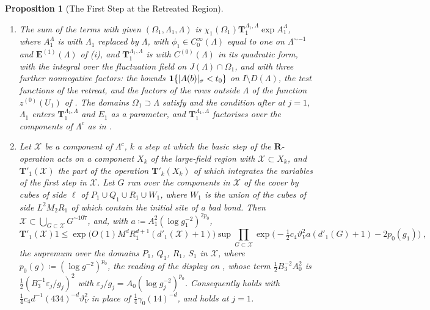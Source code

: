 \documentclass[11pt]{preprint}
\newcommand{\id}{\mathbf 1}
\DeclarePairedDelimiter{\abs}{\lvert}{\rvert}
\numberwithin{equation}{section}
\newtheorem{proposition}{Proposition}
\theoremstyle{definition}
\theoremstyle{remark}
\theoremstyle{plain}
\begin{document}
\begin{proposition}[The First Step at the Retreated Region]
\begin{enumerate}[label=(\roman*)]
\item The sum of the terms with given $(\Omega_1, \Lambda_1, \Lambda)$ is $\chi_1(\Omega_1)\mathbf T_1^{\Lambda_1, \Lambda}\exp A_1^\Lambda$, where $A^\Lambda_1$ is \cite[(1.30), p.~254]{BalabanCRE} with $\Lambda_1$ replaced by $\Lambda$, with $\phi_1 \in C_0^\infty(\Lambda)$ equal to one on $\Lambda^{\sim-1}$ and $\mathbf E^{(1)}(\Lambda)$ of (i), and $\mathbf T_1^{\Lambda_1, \Lambda}$ is \cite[(1.29), p.~254]{BalabanCRE} with $C^{(0)}(\Lambda)$ in its quadratic form, with the integral over the fluctuation field on $J(\Lambda) \cap \Omega_1$, and with three further nonnegative factors: the bounds $\id\{\abs{A(b)}_\sigma < t_0\}$ on $I \setminus D(\Lambda)$, the test functions of the retreat, and the factors of the rows outside $\Lambda$ of the function $z^{(0)}(U_1)$ of \cite[(3.5)]{WilsonFirstStep}. The domains $\Omega_1 \supset \Lambda$ satisfy \cite[(2.1), p.~254]{BalabanCRE} and the condition after \cite[(2.3), p.~255]{BalabanCRE} at $j = 1$, $\Lambda_1$ enters $\mathbf T^{\Lambda_1, \Lambda}_1$ and $E_1$ as a parameter, and $\mathbf T^{\Lambda_1, \Lambda}_1$ factorises over the components of $\Lambda^c$ as in \cite[(2.19), (2.21), p.~258]{BalabanCRE}.
\item Let $\mathcal X$ be a component of $\Lambda^c$, $k$ a step at which the basic step of the $\mathbf R$-operation acts on a component $X_k$ of the large-field region with $\mathcal X \subset X_k$, and $\mathbf T'_1(\mathcal X)$ the part of the operation $\mathbf T'_k(X_k)$ of \cite[(1.71), p.~379]{BalabanLFR2} which integrates the variables of the first step in $\mathcal X$. Let $G$ run over the components in $\mathcal X$ of the cover by cubes of side $\ell$ of $P_1 \cup Q_1 \cup R_1 \cup W_1$, where $W_1$ is the union of the cubes of side $L^2M_2R_1$ of \cite[(1.18), p.~250]{BalabanCRE} which contain the initial site of a bad bond. Then $\mathcal X \subset \bigcup_{G \subset \mathcal X}G^{\sim107}$, and, with $a \coloneqq A_1^2(\log g_1^{-2})^{2p_0}$,
\begin{equation}\label{eq:retreated-factor}
    \mathbf T'_1(\mathcal X)1 \leq \exp\bigl(O(1)M^dR_1^{d+1}(d'_1(\mathcal X) + 1)\bigr)\sup\prod_{G \subset \mathcal X}\exp\bigl(-\tfrac12c_4\vartheta_V^2a(d'_1(G) + 1) - 2p_0(g_1)\bigr)\;,
\end{equation}
the supremum over the domains $P_1$, $Q_1$, $R_1$, $S_1$ in $\mathcal X$, where $p_0(g) \coloneqq (\log g^{-2})^{p_0}$, the reading of the display on \cite[p.~381]{BalabanLFR2}, whose term $\frac12B_3^{-2}A_0^2$ is $\frac12(B_3^{-1}\varepsilon_j/g_j)^2$ with $\varepsilon_j/g_j = A_0(\log g_j^{-2})^{p_0}$. Consequently \cite[(1.82), p.~385]{BalabanLFR2} holds with $\frac14c_4d^{-1}(434)^{-d}\vartheta_V^2$ in place of $\frac14\gamma_0(14)^{-d}$, and \cite[(1.80), p.~384]{BalabanLFR2} holds at $j = 1$.

\end{enumerate}
\end{proposition}
\end{document}
